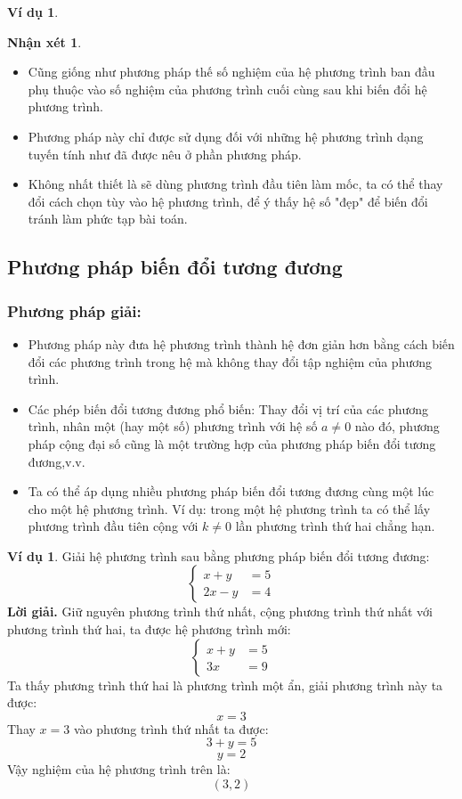 \documentclass[12pt,a4paper,oneside]{book}
\theoremstyle{theorem}
\theoremstyle{definition}
\newtheorem{nx}[theorem2]{Nhận xét}
\newtheorem{vd}[theorem2]{Ví dụ}
\begin{document}
\begin{enumerate}
\begin{vd}
\begin{nx}
     \begin{itemize}
        \item Cũng giống như phương pháp thế số nghiệm của hệ phương trình ban đầu phụ thuộc vào số nghiệm của phương trình cuối cùng sau khi biến đổi hệ phương trình.
        \item Phương pháp này chỉ được sử dụng đối với những hệ phương trình dạng tuyến tính như đã được nêu ở phần phương pháp.
        \item Không nhất thiết là sẽ dùng phương trình đầu tiên làm mốc, ta có thể thay đổi cách chọn tùy vào hệ phương trình, để ý thấy hệ số "đẹp" để biến đổi tránh làm phức tạp bài toán.
        
    \end{itemize}
\end{nx}
             \end{vd}
       \end{enumerate}
       \subsection{Phương pháp biến đổi tương đương}
       \subsubsection{Phương pháp giải:}
       \begin{itemize}
           \item Phương pháp này đưa hệ phương trình thành hệ đơn giản hơn bằng cách biến đổi các phương trình trong hệ mà không thay đổi tập nghiệm của phương trình.
           \item Các phép biến đổi tương đương phổ biến: Thay đổi vị trí của các phương trình, nhân một (hay một số) phương trình với hệ số $a\neq0$ nào đó, phương pháp cộng đại số cũng là một trường hợp của phương pháp biến đổi tương đương,v.v.
           \item Ta có thể áp dụng nhiều phương pháp biến đổi tương đương cùng một lúc cho một hệ phương trình.
           Ví dụ: trong một hệ phương trình ta có thể lấy phương trình đầu tiên cộng với $k\neq0$ lần phương trình thứ hai chẳng hạn.
       \end{itemize}
       \begin{vd}
      Giải hệ phương trình sau bằng phương pháp biến đổi tương đương:
\[
\left\{
\begin{aligned}
x+y &= 5\\
2x-y &= 4
\end{aligned}
\right.
\]
\textbf{Lời giải.}
Giữ nguyên phương trình thứ nhất, cộng phương trình thứ nhất với phương trình thứ hai, ta được hệ phương trình mới:
\[
\left\{
\begin{aligned}
x+y &= 5\\
3x &= 9
\end{aligned}
\right.
\]
Ta thấy phương trình thứ hai là phương trình một ẩn, giải phương trình này ta được:
\[
x=3
\]
Thay \(x=3\) vào phương trình thứ nhất ta được:
\[
3+y=5
\]
\[
y=2
\]
Vậy nghiệm của hệ phương trình trên là:
\[
\boxed{(3,2)}
\]
\end{vd}
\end{document}
